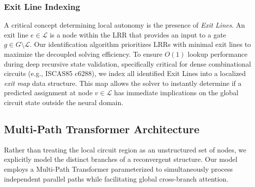 \documentclass[conference]{IEEEtran}
\begin{document}
\subsubsection{Exit Line Indexing}
A critical concept determining local autonomy is the presence of \textit{Exit Lines}. An exit line $e \in \mathcal{L}$ is a node within the LRR that provides an input to a gate $g \in G \setminus \mathcal{L}$. Our identification algorithm prioritizes LRRs with minimal exit lines to maximize the decoupled solving efficiency. To ensure $O(1)$ lookup performance during deep recursive state validation, specifically critical for dense combinational circuits (e.g., ISCAS85 c6288), we index all identified Exit Lines into a localized \textit{exit map} data structure. This map allows the solver to instantly determine if a predicted assignment at node $v \in \mathcal{L}$ has immediate implications on the global circuit state outside the neural domain.

\subsection{Multi-Path Transformer Architecture}
Rather than treating the local circuit region as an unstructured set of nodes, we explicitly model the distinct branches of a reconvergent structure. Our model employs a Multi-Path Transformer parameterized to simultaneously process independent parallel paths while facilitating global cross-branch attention.
\end{document}
